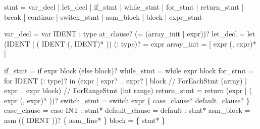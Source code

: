 \documentclass[
  11pt,
  a4paper,
]{report}
\newenvironment{Shaded}{\begin{snugshade}\small}{\end{snugshade}}
\newcommand{\NormalTok}[1]{#1}
\begin{document}
\begin{Shaded}
\begin{Highlighting}[]
\NormalTok{stmt           = var\_decl | let\_decl | if\_stmt | while\_stmt | for\_stmt}
\NormalTok{               | return\_stmt | \textquotesingle{}break\textquotesingle{} | \textquotesingle{}continue\textquotesingle{} | switch\_stmt}
\NormalTok{               | asm\_block | block | expr\_stmt}

\NormalTok{var\_decl       = \textquotesingle{}var\textquotesingle{} IDENT \textquotesingle{}:\textquotesingle{} type at\_clause? (\textquotesingle{}=\textquotesingle{} (array\_init | expr))?}
\NormalTok{let\_decl       = \textquotesingle{}let\textquotesingle{} (IDENT | \textquotesingle{}(\textquotesingle{} IDENT (\textquotesingle{},\textquotesingle{} IDENT)* \textquotesingle{})\textquotesingle{}) (\textquotesingle{}:\textquotesingle{} type)? \textquotesingle{}=\textquotesingle{} expr}
\NormalTok{array\_init     = \textquotesingle{}[\textquotesingle{} expr (\textquotesingle{},\textquotesingle{} expr)* \textquotesingle{}]\textquotesingle{}}

\NormalTok{if\_stmt        = \textquotesingle{}if\textquotesingle{} expr block (\textquotesingle{}else\textquotesingle{} block)?}
\NormalTok{while\_stmt     = \textquotesingle{}while\textquotesingle{} expr block}
\NormalTok{for\_stmt       = \textquotesingle{}for\textquotesingle{} IDENT (\textquotesingle{}:\textquotesingle{} type)? \textquotesingle{}in\textquotesingle{}}
\NormalTok{                 (expr \textquotesingle{}[\textquotesingle{} expr? \textquotesingle{}..\textquotesingle{} expr? \textquotesingle{}]\textquotesingle{} block   // ForEachStmt (array)}
\NormalTok{                 | expr \textquotesingle{}..\textquotesingle{} expr block)                  // ForRangeStmt (int range)}
\NormalTok{return\_stmt    = \textquotesingle{}return\textquotesingle{} (expr | \textquotesingle{}(\textquotesingle{} expr (\textquotesingle{},\textquotesingle{} expr)* \textquotesingle{})\textquotesingle{})?}
\NormalTok{switch\_stmt    = \textquotesingle{}switch\textquotesingle{} expr \textquotesingle{}\{\textquotesingle{} case\_clause* default\_clause? \textquotesingle{}\}\textquotesingle{}}
\NormalTok{case\_clause    = \textquotesingle{}case\textquotesingle{} INT \textquotesingle{}:\textquotesingle{} stmt*}
\NormalTok{default\_clause = \textquotesingle{}default\textquotesingle{} \textquotesingle{}:\textquotesingle{} stmt*}
\NormalTok{asm\_block      = \textquotesingle{}asm\textquotesingle{} (\textquotesingle{}(\textquotesingle{} IDENT \textquotesingle{})\textquotesingle{})? \textquotesingle{}\{\textquotesingle{} asm\_line* \textquotesingle{}\}\textquotesingle{}}
\NormalTok{block          = \textquotesingle{}\{\textquotesingle{} stmt* \textquotesingle{}\}\textquotesingle{}}


\end{Highlighting}
\end{Shaded}
\end{document}
